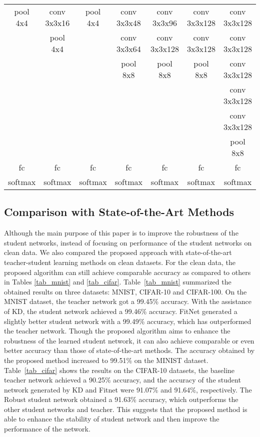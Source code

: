 \documentclass[journal]{IEEEtran}
\newcommand{\Tref}[1]{Table~\ref{#1}}
\begin{document}
\begin{table*}[htb]
\begin{tabular}{|c|c|c|c|c|c|c|}
pool 4x4     &  conv 3x3x16  &  pool 4x4     &  conv 3x3x48  &  conv 3x3x96  &  conv 3x3x128 &  conv 3x3x128  \\
           &  pool 4x4     &               &  conv 3x3x64  &  conv 3x3x128 &  conv 3x3x128 &  conv 3x3x128  \\
           &               &               &  pool 8x8     &  pool 8x8     &  pool 8x8     &  conv 3x3x128  \\
           &               &               &               &               &               &  conv 3x3x128  \\
           &               &               &               &               &               &  conv 3x3x128  \\
           &               &               &               &               &               &  pool 8x8      \\
\hline
fc  &  fc  &  fc  &  fc  &  fc  &  fc  &  fc  \\
softmax  &  softmax  &  softmax  &  softmax  &  softmax  &  softmax  &  softmax  \\
\hline
\end{tabular}
\label{tab_arch_4}
\end{table*}


\subsection{Comparison with State-of-the-Art Methods}
Although the main purpose of this paper is to improve the robustness of the student networks, instead of focusing on performance of the student networks on clean data. We also compared the proposed approach with state-of-the-art teacher-student learning methods on clean datasets. For the clean data, the proposed algorithm can still achieve comparable accuracy as compared to others in Tables \ref{tab_mnist} and \ref{tab_cifar}. \Tref{tab_mnist} summarized the obtained results on three datasets: MNIST, CIFAR-10 and CIFAR-100. On the MNIST dataset, the teacher network got a 99.45\% accuracy. With the assistance of KD, the student network achieved a 99.46\% accuracy. FitNet generated a slightly better student network with a 99.49\% accuracy, which has outperformed the teacher network. Though the proposed algorithm aims to enhance the robustness of the learned student network, it can also achieve comparable or even better accuracy than those of state-of-the-art methods. The accuracy obtained by the proposed method increased to 99.51\% on the MINIST dataset. 
\Tref{tab_cifar} shows the results on the CIFAR-10 datasets, the baseline teacher network achieved a 90.25\% accuracy, and the accuracy of the student network generated by KD and Fitnet were 91.07\% and 91.64\%, respectively. The Robust student network obtained a 91.63\% accuracy, which outperforms the other student networks and teacher. This suggests that the proposed method is able to enhance the stability of student network and then improve the performance of the network.
\end{document}
